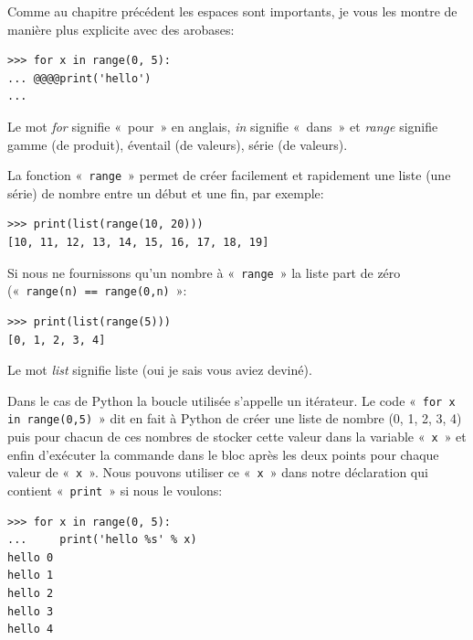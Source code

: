 Comme au chapitre précédent les espaces sont importants, je vous les montre de manière plus explicite avec des arobases:

\begin{Verbatim}[frame=single,rulecolor=\color{gray}, label=ne pas saisir]
>>> for x in range(0, 5):
... @@@@print('hello')
...
\end{Verbatim}

Le mot \emph{for} signifie « pour »  en anglais, \emph{in} signifie « dans » et \emph{range} signifie gamme (de produit), éventail (de valeurs), série (de valeurs).

La fonction « \texttt{range} » permet de créer facilement et rapidement une liste (une série) de nombre entre un début et une fin, par exemple:

\begin{Verbatim}[frame=single,rulecolor=\color{mbleu}, label=à taper]
>>> print(list(range(10, 20)))
[10, 11, 12, 13, 14, 15, 16, 17, 18, 19]
\end{Verbatim}

Si nous ne fournissons qu'un nombre à « \texttt{range} » la liste part de zéro (« \texttt{range(n) == range(0,n)} »:

\begin{Verbatim}[frame=single,rulecolor=\color{mbleu}, label=à taper]
>>> print(list(range(5)))
[0, 1, 2, 3, 4]
\end{Verbatim}

Le mot \emph{list} signifie liste (oui je sais vous aviez deviné).

Dans le cas de Python la boucle utilisée s'appelle un itérateur. Le code « \texttt{for x in range(0,5)} » dit en fait à Python de créer une liste de nombre (0, 1, 2, 3, 4) puis pour chacun de ces nombres de stocker cette valeur dans la variable « \texttt{x} » et enfin d'exécuter la commande dans le bloc après les deux points pour chaque valeur de « \texttt{x} ». Nous pouvons utiliser ce « \texttt{x} »  dans notre déclaration qui contient « \texttt{print} » si nous le voulons:

\begin{Verbatim}[frame=single,rulecolor=\color{green}, label=à taper avec attention]
>>> for x in range(0, 5):
...     print('hello %s' % x)
hello 0
hello 1
hello 2
hello 3
hello 4
\end{Verbatim}


